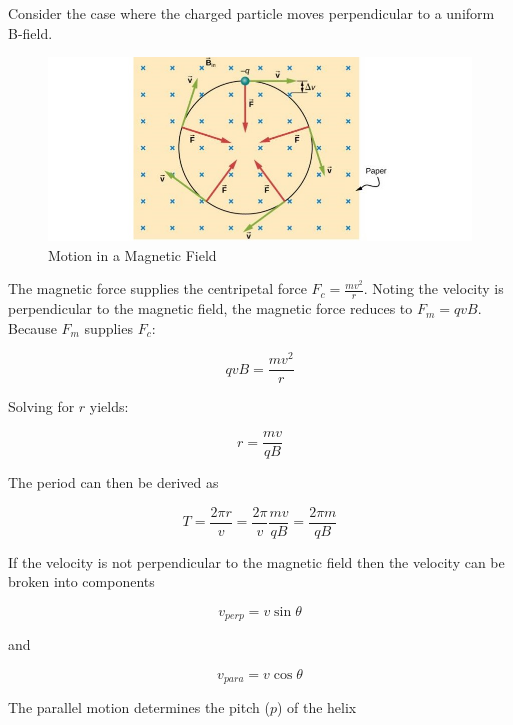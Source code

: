 \documentclass[14pt]{memoir}
\begin{document}
Consider the case where the charged particle moves perpendicular to a uniform B-field. 

\begin{figure}[H]
\begin{center}
\includegraphics[scale=0.60]{fig/fig_11_07.jpg}
\caption{Motion in a Magnetic Field}
\label{fig:11_07}
\end{center}
\end{figure}

The magnetic force supplies the centripetal force $F_c = \frac{m v^2}{r}$. Noting the velocity is perpendicular to the magnetic field, the magnetic force reduces to $F_m = qvB$. Because $F_m$ supplies $F_c$:

\begin{equation}
qvB = \frac{m v^2}{r}
\end{equation}

Solving for $r$ yields:

\begin{equation}
r = \frac{mv}{qB}
\end{equation}

The period can then be derived as 

\begin{equation}
T = \frac{2 \pi r}{v} = \frac{2 \pi}{v} \frac{mv}{qB} = \frac{2 \pi m}{qB}
\end{equation}


If the velocity is not perpendicular to the magnetic field then the velocity can be broken into components

\begin{equation}
v_{perp} = v \sin{\theta}
\end{equation}

and

\begin{equation}
v_{para} = v \cos{\theta}
\end{equation}

The parallel motion determines the pitch ($p$) of the helix
\end{document}
